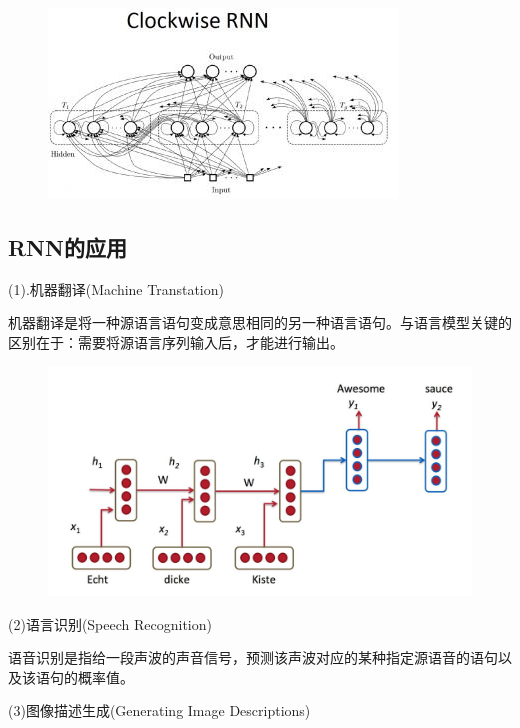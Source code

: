 \documentclass[openbib]{article}
\begin{document}
\begin{figure}[htbp]
	\centering
	\includegraphics[scale=0.7]{CW-RNN结构图}
\end{figure}
\subsection{RNN的应用}
\begin{center}
	(1).机器翻译(Machine Transtation)
\end{center}

机器翻译是将一种源语言语句变成意思相同的另一种语言语句。与语言模型关键的区别在于：需要将源语言序列输入后，才能进行输出。

\begin{figure}[H]
	\centering
	\includegraphics[scale=0.2]{机器翻译示例}
\end{figure}

\begin{center}
	(2)语言识别(Speech Recognition)
\end{center}

语音识别是指给一段声波的声音信号，预测该声波对应的某种指定源语音的语句以及该语句的概率值。

\begin{center}
	(3)图像描述生成(Generating Image Descriptions)
\end{center}
\end{document}
